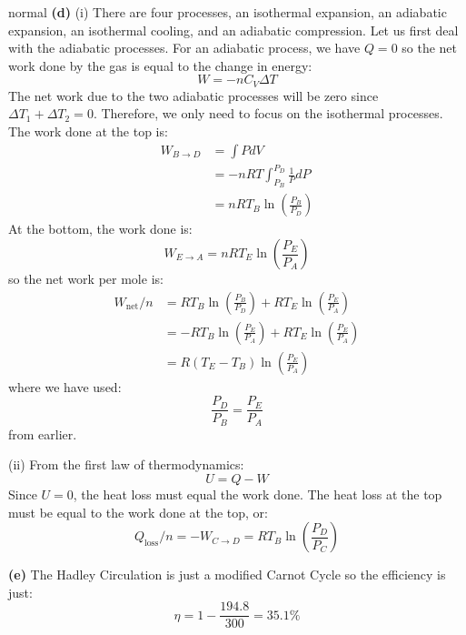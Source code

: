 \begin{solution}{normal}
\noindent \textbf{(d)} (i) There are four processes, an isothermal expansion, an adiabatic expansion, an isothermal cooling, and an adiabatic compression. Let us first deal with the adiabatic processes. For an adiabatic process, we have $Q=0$ so the net work done by the gas is equal to the change in energy:
$$W = -nC_V\Delta T$$
The net work due to the two adiabatic processes will be zero since $\Delta T_1+\Delta T_2=0$. Therefore, we only need to focus on the isothermal processes. The work done at the top is:
\begin{align*}
W_{B\to D} &= \int P dV  \\
&= -nRT \int_{P_B}^{P_D} \frac{1}{P} dP \\
&= nRT_B\ln\left(\frac{P_B}{P_D}\right)
\end{align*}
At the bottom, the work done is:
$$W_{E \to A} = nRT_E\ln\left(\frac{P_E}{P_A}\right)$$
so the net work per mole is:
\begin{align*}
W_\text{net}/n &= RT_B\ln\left(\frac{P_B}{P_D}\right) + RT_E\ln\left(\frac{P_E}{P_A}\right) \\
&= -RT_B\ln\left(\frac{P_E}{P_A}\right) + RT_E\ln\left(\frac{P_E}{P_A}\right) \\
&= R(T_E-T_B)\ln\left(\frac{P_E}{P_A}\right)
\end{align*}
where we have used:
$$\frac{P_D}{P_B} = \frac{P_E}{P_A}$$
from earlier.
\vspace{3mm}

\noindent (ii) From the first law of thermodynamics:
$$U = Q - W$$
Since $U=0$, the heat loss must equal the work done. The heat loss at the top must be equal to the work done at the top, or:
$$Q_\text{loss}/n = -W_{C \to D} = RT_B\ln\left(\frac{P_D}{P_C}\right)$$
\vspace{3mm}

\noindent \textbf{(e)} The Hadley Circulation is just a modified Carnot Cycle so the efficiency is just:
$$\eta = 1 - \frac{194.8}{300} = 35.1\%$$
\vspace{3mm}


\end{solution}
